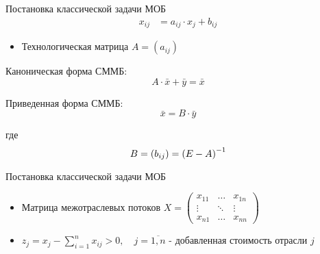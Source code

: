 \documentclass[serif,10pt,utf8, russian]{beamer}
\begin{document}
\begin{frame}{Постановка классической задачи МОБ}
\begin{align}
{x}_{ij} &= {a}_{ij}\cdot{x}_j + {b}_{ij}\label{four}
\end{align}
\pause
\begin{itemize}
\item Технологическая матрица $A=\left({a}_{ij}\right)$
\end{itemize}
\pause
\begin{block}{Каноническая форма СММБ:}
\pause
\begin{equation}
A\cdot\bar x + \bar y = \bar x \label{five}
\end{equation}
\end{block}
\pause
\begin{block}{Приведенная форма СММБ:}
\pause
\begin{equation}
\bar x = B\cdot\bar y \label{six}
\end{equation}
\pause
\par{где\\}
\begin{equation}
B = \left({b}_{ij}\right) = {\left( E-A\right)}^{-1} \notag
\end{equation}
\end{block}
\end{frame}

\begin{frame}{Постановка классической задачи МОБ}
\begin{itemize}
\item Матрица межотраслевых потоков $X = \begin{pmatrix}x_{11} & \dots & x_{1n} \\\vdots & \ddots & \vdots \\x_{n1} & \dots & x_{nn}\end{pmatrix}$
\pause
\item ${z}_j={x}_j - \sum\limits_{i=1}^n {x}_{ij} > 0, \quad j = \overline{1,n}$ - добавленная стоимость отрасли $j$
\end{itemize}
\end{frame}
\end{document}
